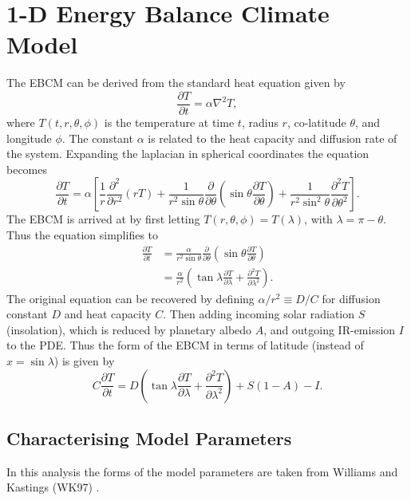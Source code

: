 \documentclass[12pt, onecolumn]{revtex4-2}    %
\newcommand{\partialderiv}[2]{\frac{\partial {#1}}{\partial {#2}}}
\newcommand{\partialderivsecnd}[2]{\frac{\partial^2 {#1}}{\partial {#2}^2}}
\begin{document}
\section{1-D Energy Balance Climate Model}\label{sec:1DEBCM}
The EBCM can be derived from the standard heat equation given by
\begin{equation}
    \partialderiv{T}{t} = \alpha \nabla^2 T,
\end{equation}
where $T(t, r, \theta, \phi)$ is the temperature at time $t$, radius $r$, co-latitude $\theta$, and longitude $\phi$.
The constant $\alpha$ is related to the heat capacity and diffusion rate of the system.
Expanding the laplacian in spherical coordinates the equation becomes
\begin{equation}
    \partialderiv{T}{t} = \alpha \left[\frac{1}{r} \partialderivsecnd{}{r} (r T)
        + \frac{1}{r^2 \sin\theta} \partialderiv{}{\theta}\left(\sin\theta \partialderiv{T}{\theta}\right)
        + \frac{1}{r^2 \sin^2\theta} \partialderivsecnd{T}{\theta} \right]. \label{eq:FullyExpandedHeatEqn}
\end{equation}
The EBCM is arrived at by first letting $T(r, \theta, \phi) = T(\lambda)$, with $\lambda = \pi - \theta$. Thus the equation simplifies to
\begin{align}
    \partialderiv{T}{t} & = \frac{\alpha}{r^2 \sin\theta} \partialderiv{}{\theta}\left(\sin\theta \partialderiv{T}{\theta}\right)   \\
                        & = \frac{\alpha}{r^2} \left(\tan\lambda \partialderiv{T}{\lambda} + \partialderivsecnd{T}{\lambda}\right).
\end{align}
The original equation can be recovered by defining $\alpha / r^2 \equiv D / C$ for diffusion constant $D$ and heat capacity $C$.
Then adding incoming solar radiation $S$ (insolation), which is reduced by planetary albedo $A$, and outgoing IR-emission $I$ to the PDE.
Thus the form of the EBCM in terms of latitude (instead of $x = \sin\lambda$) is given by
\begin{equation}
    C\partialderiv{T}{t} = D \left(\tan\lambda \partialderiv{T}{\lambda} + \partialderivsecnd{T}{\lambda}\right) + S(1-A) - I.
\end{equation}
\subsection{Characterising Model Parameters} \label{ssec:CharacterisingModelParameters} %
In this analysis the forms of the model parameters are taken from Williams and Kastings (WK97) \cite{WK97}.
\end{document}
